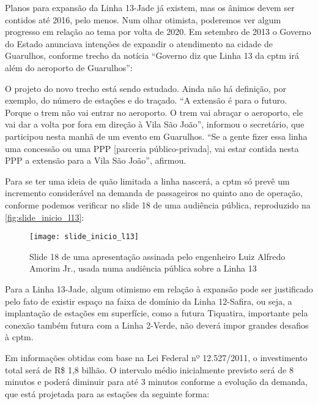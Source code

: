 \documentclass[11pt,fleqn]{book} %
\begin{document}
Planos para expansão da Linha 13-Jade já existem, mas os ânimos devem ser contidos até 2016, pelo menos. Num olhar otimista, poderemos ver algum progresso em relação ao tema por volta de 2020. Em setembro de 2013 o Governo do Estado anunciava intenções de expandir o atendimento na cidade de Guarulhos, conforme trecho da notícia “Governo diz que Linha 13 da \gls{cptm} irá além do aeroporto de Guarulhos”:

\begin{citacao}
	O projeto do novo trecho está sendo estudado. Ainda não há definição, por exemplo, do número de estações e do traçado. “A extensão é para o futuro. Porque o trem não vai entrar no aeroporto. O trem vai abraçar o aeroporto, ele vai dar a volta por fora em direção à Vila São João”, informou o secretário, que participou nesta manhã de um evento em Guarulhos. “Se a gente fizer essa linha uma concessão ou uma PPP [parceria público-privada], vai estar contida nesta PPP a extensão para a Vila São João”, afirmou.
\end{citacao}

Para se ter uma ideia de quão limitada a linha nascerá, a \gls{cptm} só prevê um incremento considerável na demanda de passageiros no quinto ano de operação, conforme podemos verificar no slide 18 de uma audiência pública, reproduzido na \autoref{fig:slide_inicio_l13}:

\begin{landscape}
\begin{figure}[h]
	\centering
	\caption[Slide de apresentação sobre a Linha 13-Jade]{Slide 18 de uma apresentação assinada pelo engenheiro Luiz Alfredo Amorim Jr., usada numa audiência pública sobre a Linha 13}
	\texttt{[image: slide\_inicio\_l13]}
	\label{fig:slide_inicio_l13}
\end{figure}
\end{landscape}


Para a Linha 13-Jade, algum otimismo em relação à expansão pode ser justificado pelo fato de existir espaço na faixa de domínio da Linha 12-Safira, ou seja, a implantação de estações em superfície, como a futura Tiquatira, importante pela conexão também futura com a Linha 2-Verde, não deverá impor grandes desafios à \gls{cptm}.

Em informações obtidas com base na Lei Federal nº 12.527/2011, o investimento total será de R\$ 1,8 bilhão. O intervalo médio inicialmente previsto será de 8 minutos e poderá diminuir para até 3 minutos conforme a evolução da demanda, que está projetada para as estações da seguinte forma:
\end{document}
